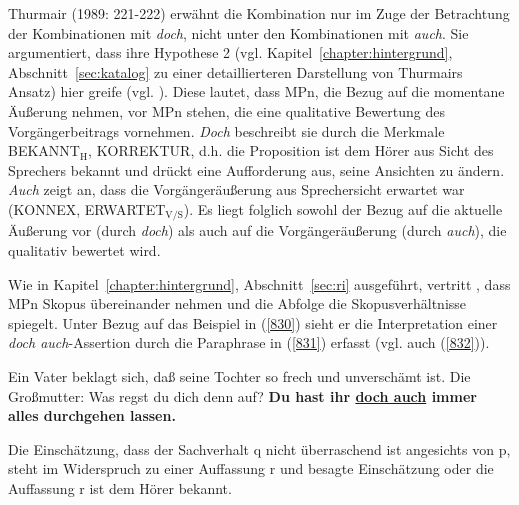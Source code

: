 Thurmair (1989: 221-222) erwähnt die Kombination nur im Zuge der Betrachtung der Kombinationen mit \textit{doch}, nicht unter den Kombinationen mit \textit{auch}. Sie argumentiert, dass ihre Hypothese 2 (vgl. Kapitel~\ref{chapter:hintergrund}, Abschnitt~\ref{sec:katalog} zu einer detaillier\-teren Darstellung von Thurmairs Ansatz) hier greife (vgl. \citeyear[288]{Thurmair1989}). Diese lautet, dass MPn, die Bezug auf die momentane Äußerung nehmen, vor MPn stehen, die eine qualitative Bewertung des Vorgängerbeitrags vornehmen. \textit{Doch} beschreibt sie durch die Merkmale BEKANNT$_{\textrm{H}}$, KORREKTUR, d.h. die Proposition ist dem Hörer aus Sicht des Sprechers bekannt und drückt eine Aufforderung aus, seine Ansichten zu ändern. \textit{Auch} zeigt an, dass die Vorgängeräuße\-rung aus Sprechersicht erwartet war (KONNEX, ERWARTET$_{\textrm{V/S}}$). Es liegt folglich sowohl der Bezug auf die aktuelle Äußerung vor (durch \textit{doch}) als auch auf die Vorgängeräußerung (durch \textit{auch}), die qualitativ bewertet wird. 

Wie in Kapitel~\ref{chapter:hintergrund}, Abschnitt~\ref{sec:ri} ausgeführt, vertritt \citet{Rinas2007}, dass MPn Skopus übereinander nehmen und die Abfolge die Skopusverhältnisse spiegelt. Unter Bezug auf das Beispiel in (\ref{830}) sieht er die Interpretation einer \textit{doch auch}-Assertion durch die Paraphrase in (\ref{831}) erfasst (vgl. auch (\ref{832})).

\begin{exe}
	\ex\label{830}
	Ein Vater beklagt sich, daß seine Tochter so frech und unverschämt ist. Die Großmutter: Was regst du dich denn auf? \textbf{Du hast ihr \underline{doch auch} immer alles durchgehen lassen.}
	\hfill\hbox{\citet[221]{Thurmair1989}}
\end{exe}

\begin{exe}
	\ex\label{831}
	\glq Die Einschätzung, dass der Sachverhalt q nicht überraschend ist angesichts von p, steht im Widerspruch zu einer Auffassung r und besagte 				Einschätzung oder die Auffassung r ist dem Hörer bekannt.\grq {}
\end{exe}


